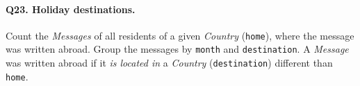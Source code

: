 \paragraph{\textbf{Q23}. Holiday destinations.}
Count the \emph{Messages} of all residents of a given \emph{Country}
(\texttt{home}), where the message was written abroad. Group the
messages by \texttt{month} and \texttt{destination}.
A \emph{Message} was written abroad if it \emph{is located in} a
\emph{Country} (\texttt{destination}) different than \texttt{home}.
